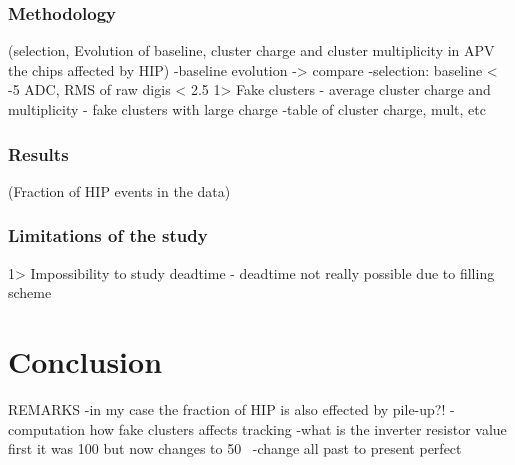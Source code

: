 \subsubsection{Methodology}
        (selection, Evolution of baseline, cluster charge and cluster multiplicity in APV the chips affected by HIP)
-baseline evolution -> compare
-selection: baseline < -5 ADC, RMS of raw digis < 2.5
         1> Fake clusters
- average cluster charge and multiplicity - fake clusters with large charge
-table of cluster charge, mult, etc
\subsubsection{Results}
      (Fraction of HIP events in the data)

\subsubsection{Limitations of the study}
         1> Impossibility to study deadtime
- deadtime not really possible due to filling scheme

\section{Conclusion}




REMARKS
-in my case the fraction of HIP is also effected by pile-up?!
-computation how fake clusters affects tracking
-what is the inverter resistor value first it was 100 but now changes to 50~\cite{Gennai:2003as}
-change all past to present perfect
